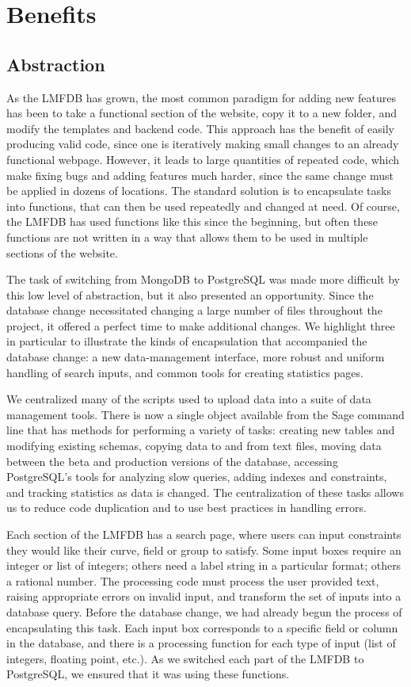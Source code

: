 \documentclass{amsart}
\begin{document}
\section{Benefits}

\subsection{Abstraction}

As the LMFDB has grown, the most common paradigm for adding new features has been to take a functional section of the website, copy it to a new folder, and modify the templates and backend code.
This approach has the benefit of easily producing valid code, since one is iteratively making small changes to an already functional webpage.
However, it leads to large quantities of repeated code, which make fixing bugs and adding features much harder, since the same change must be applied in dozens of locations.
The standard solution is to encapsulate tasks into functions, that can then be used repeatedly and changed at need.
Of course, the LMFDB has used functions like this since the beginning, but often these functions are not written in a way that allows them to be used in multiple sections of the website.

The task of switching from MongoDB to PostgreSQL was made more difficult by this low level of abstraction, but it also presented an opportunity.
Since the database change necessitated changing a large number of files throughout the project, it offered a perfect time to make additional changes.
We highlight three in particular to illustrate the kinds of encapsulation that accompanied the database change: a new data-management interface, more robust and uniform handling of search inputs, and common tools for creating statistics pages.

We centralized many of the scripts used to upload data into a suite of data management tools.
There is now a single object available from the Sage command line that has methods for performing a variety of tasks: creating new tables and modifying existing schemas, copying data to and from text files, moving data between the beta and production versions of the database, accessing PostgreSQL's tools for analyzing slow queries, adding indexes and constraints, and tracking statistics as data is changed.
The centralization of these tasks allows us to reduce code duplication and to use best practices in handling errors.

Each section of the LMFDB has a search page, where users can input constraints they would like their curve, field or group to satisfy.
Some input boxes require an integer or list of integers; others need a label string in a particular format; others a rational number.
The processing code must process the user provided text, raising appropriate errors on invalid input, and transform the set of inputs into a database query.
Before the database change, we had already begun the process of encapsulating this task.
Each input box corresponds to a specific field or column in the database, and there is a processing function for each type of input (list of integers, floating point, etc.).
As we switched each part of the LMFDB to PostgreSQL, we ensured that it was using these functions.
\end{document}
